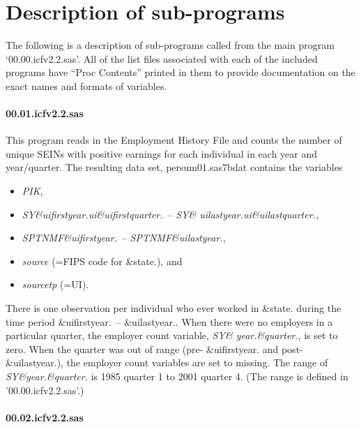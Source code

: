 \section{Description of sub-programs}

The following is a description of sub-programs called from the main program
`00.00.icfv2.2.sas'. 
All of the list files associated with each of the included programs have
``Proc Contents'' printed in them to provide documentation on the exact
names and formats of variables. 

\paragraph{00.01.icfv2.2.sas}

This program reads in the Employment History File and counts the number of
unique SEINs with positive earnings for each individual in each year and
year/quarter. The resulting data set, persum01.sas7bdat contains the
variables

\begin{itemize}
\item \textit{PIK},

\item \textit{SY{\&}uifirstyear.ui{\&}uifirstquarter.}~-- \textit{SY{\&}%
uilastyear.ui{\&}uilastquarter.},

\item \textit{SPTNMF{\&}uifirstyear.}~-- \textit{SPTNMF{\&}uilastyear.},

\item \textit{source} (=FIPS code for {\&}state.), and

\item \textit{sourcetp} (=UI).
\end{itemize}

There is one observation per individual who ever worked in {\&}state. during
the time period {\&}uifirstyear.~-- {\&}uilastyear.. When there were no
employers in a particular quarter, the employer count variable, \textit{SY{\&%
}year.{\&}quarter.}, is set to zero. When the quarter was out of range (pre-{%
\&}uifirstyear. and post-{\&}uilastyear.), the employer count variables are
set to missing. The range of \textit{SY{\&}year.{\&}quarter.} is 1985
quarter 1 to 2001 quarter 4. (The range is defined in '00.00.icfv2.2.sas'.)

\paragraph{00.02.icfv2.2.sas}

